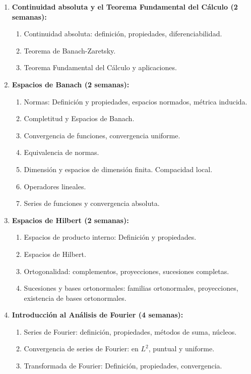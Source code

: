 \begin{refsection}
\begin{enumerate}
\item \textbf{Continuidad absoluta y el Teorema Fundamental del Cálculo (2 semanas):} 

\begin{enumerate}
    \item Continuidad absoluta: definición, propiedades, diferenciabilidad.
    \item Teorema de Banach-Zaretsky.
    \item Teorema Fundamental del Cálculo y aplicaciones.
\end{enumerate}



\item \textbf{Espacios de Banach (2 semanas):} 
\begin{enumerate}
    \item Normas: Definición y propiedades, espacios normados, métrica inducida.
    \item Completitud y Espacios de Banach.
    \item Convergencia de funciones, convergencia uniforme.
    \item Equivalencia de normas.
    \item Dimensión y espacios de dimensión finita. Compacidad local.
    \item Operadores lineales.
    \item Series de funciones y convergencia absoluta.
\end{enumerate}

\item \textbf{Espacios de Hilbert (2 semanas):} 
\begin{enumerate}
    \item Espacios de producto interno: Definición y propiedades.
    \item Espacios de Hilbert.
    \item Ortogonalidad: complementos, proyecciones, sucesiones completas.
    \item Sucesiones y bases ortonormales: familias ortonormales, proyecciones, existencia de bases ortonormales.
\end{enumerate}



\item \textbf{Introducción al Análisis de Fourier (4 semanas):} 
\begin{enumerate}
    \item Series de Fourier: definición, propiedades, métodos de suma, núcleos.
    \item Convergencia de series de Fourier: en $L^2$, puntual y uniforme.
    \item Transformada de Fourier: Definición, propiedades, convergencia.
\end{enumerate}




\end{enumerate}
\end{refsection}
